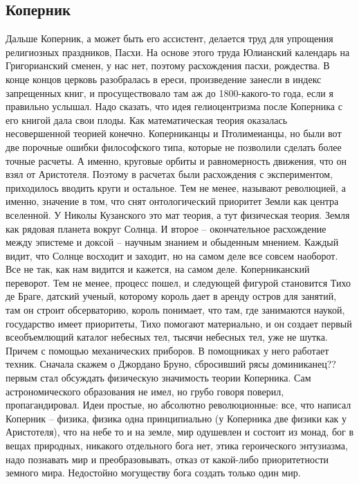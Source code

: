 \documentclass[a4paper, 12pt]{article}
\begin{document}
\subsection{Коперник}
Дальше Коперник, а может быть его ассистент, делается труд для упрощения 
религиозных праздников, Пасхи. На основе этого труда Юлианский календарь 
на Григорианский сменен, у нас нет, поэтому расхождения пасхи, 
рождества. В конце концов церковь разобралась в ереси, произведение 
занесли в индекс запрещенных книг, и просуществовало там аж до 
1800-какого-то года, если я правильно услышал. Надо сказать, что идея 
гелиоцентризма после Коперника с его книгой дала свои плоды. Как 
математическая теория оказалась несовершенной теорией конечно. 
Коперниканцы и Птолимеианцы, но были вот две порочные ошибки 
философского типа, которые не позволили сделать более точные расчеты. 
А именно, круговые орбиты и равномерность движения, что он взял от 
Аристотеля. Поэтому в расчетах были расхождения с экспериментом, 
приходилось вводить круги и остальное. Тем не менее, называют 
революцией, а именно, значение в том, что снят онтологический приоритет 
Земли как центра вселенной. У Николы Кузанского это мат теория, а тут 
физическая теория. Земля как рядовая планета вокруг Солнца. И второе -- 
окончательное расхождение между эпистеме и доксой -- научным знанием 
и обыденным мнением. Каждый видит, что Солнце восходит и заходит, но на 
самом деле все совсем наоборот. Все не так, как нам видится и кажется, 
на самом деле. Коперниканский переворот. Тем не менее, процесс пошел, 
и следующей фигурой становится Тихо де Браге, датский ученый, которому 
король дает в аренду остров для занятий, там он строит обсерваторию, 
король понимает, что там, где занимаются наукой, государство имеет 
приоритеты, Тихо помогают материально, и он создает первый всеобъемлющий 
каталог небесных тел, тысячи небесных тел, уже не шутка. Причем 
с помощью механических приборов. В помощниках у него работает техник. 
Сначала скажем о Джордано Бруно, сбросивший рясы доминиканец?? первым 
стал обсуждать физическую значимость теории Коперника. Сам 
астрономического образования не имел, но грубо говоря поверил, 
пропагандировал. Идеи простые, но абсолютно революционные: все, что 
написал Коперник -- физика, физика одна принципиально (у Коперника две 
физики как у Аристотеля), что на небе то и на земле, мир одушевлен 
и состоит из монад, бог в вещах природных, никакого отдельного бога нет, 
этика героического энтузиазма, надо познавать мир и преобразовывать, 
отказ от какой-либо приоритетности земного мира. Недостойно могуществу 
бога создать только один мир.
\end{document}
